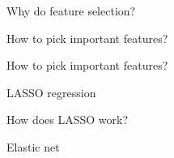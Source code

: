 \begin{frame}{Why do feature selection?}

\end{frame}
\begin{frame}{How to pick important features?}

\end{frame}
\begin{frame}{How to pick important features?}

\end{frame}
\begin{frame}{LASSO regression}

\end{frame}
\begin{frame}{How does LASSO work?}

\end{frame}
\begin{frame}{Elastic net}

\end{frame}

